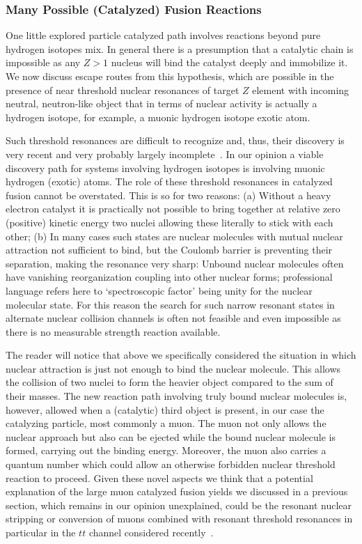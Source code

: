 \documentclass[particles,article,accept,pdftex,moreauthors]{Definitions/mdpi}
\begin{document}
\subsubsection{Many Possible (Catalyzed) Fusion Reactions}\label{sssec:ManyFusions}
One little explored particle catalyzed path involves reactions beyond pure hydrogen isotopes mix. In general there is a presumption that a catalytic chain is impossible as any $Z>1$ nucleus will bind the catalyst deeply and immobilize it. We now discuss escape routes from this hypothesis, which are possible in the presence of near threshold nuclear resonances of target $Z$ element with incoming neutral, neutron-like object that in terms of nuclear activity is actually a hydrogen isotope, for example, a muonic hydrogen isotope exotic atom.

Such threshold resonances are difficult to recognize and, thus, their discovery is very recent and very probably largely incomplete~\cite{Aprahamian:2025AA}. In our opinion a viable discovery path for systems involving hydrogen isotopes is involving muonic hydrogen (exotic) atoms. The role of these threshold resonances in catalyzed fusion cannot be overstated. This is so for two reasons: (a) Without a heavy electron catalyst it is practically not possible to bring together at relative zero (positive) kinetic energy two nuclei allowing these literally to stick with each other; (b) In many cases such states are nuclear molecules with mutual nuclear attraction not sufficient to bind, but the Coulomb barrier is preventing their separation, making the resonance very sharp: Unbound nuclear molecules often have vanishing reorganization coupling into other nuclear forms; professional language refers here to `spectroscopic factor' being unity for the nuclear molecular state. For this reason the search for such narrow resonant states in alternate nuclear collision channels is often not feasible and even impossible as there is no measurable strength reaction available.

The reader will notice that above we specifically considered the situation in which nuclear attraction is just not enough to bind the nuclear molecule. This allows the collision of two nuclei to form the heavier object compared to the sum of their masses. The new reaction path involving truly bound nuclear molecules is, however, allowed when a (catalytic) third object is present, in our case the catalyzing particle, most commonly a muon. The muon not only allows the nuclear approach but also can be ejected while the bound nuclear molecule is formed, carrying out the binding energy. Moreover, the muon also carries a quantum number which could allow an otherwise forbidden nuclear threshold reaction to proceed. Given these novel aspects we think that a potential explanation of the large muon catalyzed fusion yields we discussed in a previous section, which remains in our opinion unexplained, could be the resonant nuclear stripping or conversion of muons combined with resonant threshold resonances in particular in the $tt$ channel considered recently~\cite{Aprahamian:2025AA}.
\end{document}
